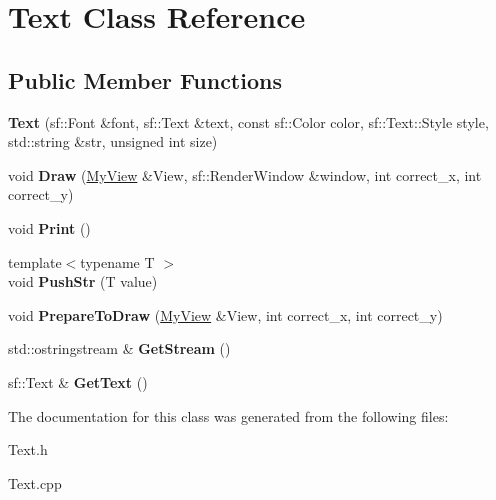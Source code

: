\hypertarget{class_text}{}\section{Text Class Reference}
\label{class_text}
\subsection*{Public Member Functions}
\begin{DoxyCompactItemize}
\item 
\mbox{\label{class_text_a3e37b942e6e90263c69d9355ae7ebb63}} 
{\bfseries Text} (sf\+::\+Font \&font, sf\+::\+Text \&text, const sf\+::\+Color color, sf\+::\+Text\+::\+Style style, std\+::string \&str, unsigned int size)
\item 
\mbox{\label{class_text_a34e2dab4f8a10f62f4da0d4eb55011b7}} 
void {\bfseries Draw} (\hyperlink{class_my_view}{My\+View} \&View, sf\+::\+Render\+Window \&window, int correct\+\_\+x, int correct\+\_\+y)
\item 
\mbox{\label{class_text_a72f85268a2666e30819a8b87490beb50}} 
void {\bfseries Print} ()
\item 
\mbox{\label{class_text_a5aeb9e86c2fba5f36b1d5520e68a510d}} 
{\footnotesize template$<$typename T $>$ }\\void {\bfseries Push\+Str} (T value)
\item 
\mbox{\label{class_text_af8c9bb8280b916276c3c979487cf980e}} 
void {\bfseries Prepare\+To\+Draw} (\hyperlink{class_my_view}{My\+View} \&View, int correct\+\_\+x, int correct\+\_\+y)
\item 
\mbox{\label{class_text_ab4091f56a59b11e1a6304a909acff0a1}} 
std\+::ostringstream \& {\bfseries Get\+Stream} ()
\item 
\mbox{\label{class_text_af1fa7ee2429a16ce75480d0e8197d0b5}} 
sf\+::\+Text \& {\bfseries Get\+Text} ()
\end{DoxyCompactItemize}


The documentation for this class was generated from the following files\+:\begin{DoxyCompactItemize}
\item 
Text.\+h\item 
Text.\+cpp\end{DoxyCompactItemize}
